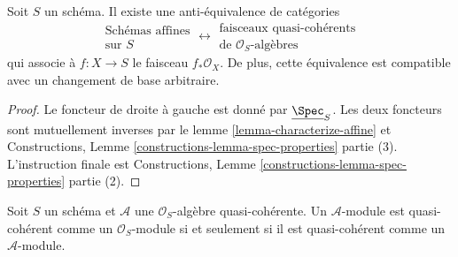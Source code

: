 \begin{lemma}
\label{lemma-affine-equivalence-algebras}
Soit $S$ un schéma. Il existe une anti-équivalence de catégories
$$
\begin{matrix}
\text{Schémas affines} \\
\text{sur }S
\end{matrix}
\longleftrightarrow
\begin{matrix}
\text{faisceaux quasi-cohérents} \\
\text{de }\mathcal{O}_S\text{-algèbres}
\end{matrix}
$$
qui associe à $f : X \to S$ le faisceau $f_*\mathcal{O}_X$. De plus, cette
équivalence est compatible avec un changement de base arbitraire.
\end{lemma}

\begin{proof}
Le foncteur de droite à gauche est donné par $\underline{\Spec}_S$.
Les deux foncteurs sont mutuellement
inverses par le lemme
\ref{lemma-characterize-affine} et Constructions, Lemme \ref{constructions-lemma-spec-properties} partie (3).
L'instruction
finale est Constructions, Lemme \ref{constructions-lemma-spec-properties} partie (2).
\end{proof}

\begin{lemma}
\label{lemma-quasi-coherence-scalar-restriction}
\begin{reference}
\cite[I, Proposition 9.6.1]{EGA}
\end{reference}
Soit $S$ un schéma et $\mathcal{A}$ une $\mathcal{O}_S$-algèbre
quasi-cohérente. Un $\mathcal{A}$-module est quasi-cohérent
comme un $\mathcal{O}_S$-module si et seulement si il
est quasi-cohérent comme un $\mathcal{A}$-module.
\end{lemma}

